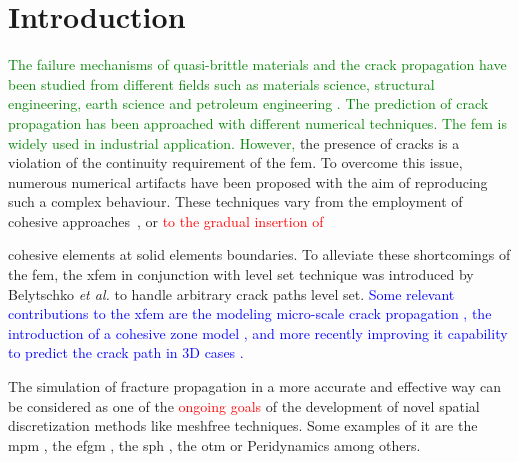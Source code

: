 \message{ !name(2020_EFM_MPM_Eigensoftening.tex)}\documentclass[preprint,12pt,a4paper]{elsarticle}
\newcommand{\PNA}[1]{
  \textcolor{red}{{#1}}
}
\newcommand{\MMP}[1]{
  \textcolor{blue}{{#1}}
}
\newcommand{\DM}[1]{
  \textcolor{green}{{#1}}
}
\begin{document}
\section{Introduction}
\label{sec:1}
\DM{The failure mechanisms of quasi-brittle materials and the  crack propagation have been studied from different fields such as materials science, structural engineering, earth science and petroleum engineering . The prediction of crack propagation has been approached with different numerical techniques. The \acrfull{fem} is widely used in industrial application. However,} the presence of cracks is a violation of the continuity requirement of the \acrshort{fem}. To overcome this issue, numerous numerical
artifacts have been proposed with the aim of reproducing such a
complex behaviour. These techniques vary from the employment of cohesive
approaches~\cite{Barenblatt,Hilleborg_1976}, or \PNA{to the gradual insertion of}
cohesive elements \cite{Ortiz_1999,Pandolfi_2002,Ruiz_2000} at solid
elements boundaries. To alleviate these shortcomings of the
\acrshort{fem}, the \acrfull{xfem} in conjunction with level set
technique was introduced by Belytschko {\it et al.}
\cite{Belytschko_03} to handle arbitrary crack paths level
set. \MMP{Some relevant contributions to the \acrshort{xfem} are the
modeling micro-scale crack propagation \cite{HUANG_2018}, the
introduction of a cohesive zone model \cite{NAGASHIMA_2016}, and more
recently improving it capability to predict the crack path in 3D cases
\cite{YUN_2019}.}

The simulation of fracture propagation in a more accurate and effective
way can be considered as one of the \PNA{ongoing goals} of the development of novel spatial discretization methods like meshfree techniques. Some
examples of it are the \acrfull{mpm}
\cite{Schreyer_2002,Chen_2002,Nairn_2003,Zhenmao_2005}, the
\acrfull{efgm} \cite{BELYTSCHKO_1995,BELYTSCHKO_2000,Zhuang_2012,Muthu_2013}, the
\acrfull{sph} \cite{Wang_2020,Wang_2019}, the \acrfull{otm} \cite{Li2010,Li_2012,Pandolfi_2013,Li_2015} or Peridynamics
\cite{HA_2011,RABCZUK_2017} among others. \\
\end{document}
